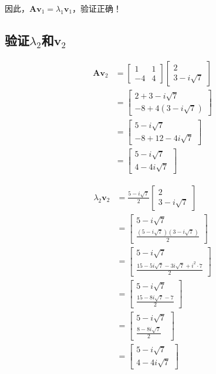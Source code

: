 \documentclass[12pt,a4paper]{article}
\begin{document}
因此，$\bm{A}\bm{v}_1 = \lambda_1 \bm{v}_1$，验证正确！

\subsection{验证$\lambda_2$和$\bm{v}_2$}

\begin{align}
\bm{A}\bm{v}_2 &= \begin{bmatrix} 1 & 1 \\ -4 & 4 \end{bmatrix} \begin{bmatrix} 2 \\ 3 - i\sqrt{7} \end{bmatrix} \\
&= \begin{bmatrix} 2 + 3 - i\sqrt{7} \\ -8 + 4(3 - i\sqrt{7}) \end{bmatrix} \\
&= \begin{bmatrix} 5 - i\sqrt{7} \\ -8 + 12 - 4i\sqrt{7} \end{bmatrix} \\
&= \begin{bmatrix} 5 - i\sqrt{7} \\ 4 - 4i\sqrt{7} \end{bmatrix}
\end{align}

\begin{align}
\lambda_2 \bm{v}_2 &= \frac{5 - i\sqrt{7}}{2} \begin{bmatrix} 2 \\ 3 - i\sqrt{7} \end{bmatrix} \\
&= \begin{bmatrix} 5 - i\sqrt{7} \\ \frac{(5 - i\sqrt{7})(3 - i\sqrt{7})}{2} \end{bmatrix} \\
&= \begin{bmatrix} 5 - i\sqrt{7} \\ \frac{15 - 5i\sqrt{7} - 3i\sqrt{7} + i^2 \cdot 7}{2} \end{bmatrix} \\
&= \begin{bmatrix} 5 - i\sqrt{7} \\ \frac{15 - 8i\sqrt{7} - 7}{2} \end{bmatrix} \\
&= \begin{bmatrix} 5 - i\sqrt{7} \\ \frac{8 - 8i\sqrt{7}}{2} \end{bmatrix} \\
&= \begin{bmatrix} 5 - i\sqrt{7} \\ 4 - 4i\sqrt{7} \end{bmatrix}
\end{align}
\end{document}
